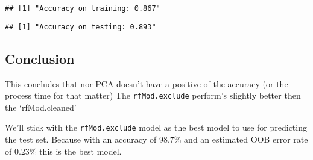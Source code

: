\documentclass[]{article}
\newenvironment{Shaded}{\begin{snugshade}}{\end{snugshade}}
\newcommand{\DecValTok}[1]{\textcolor[rgb]{0.00,0.00,0.81}{#1}}
\newcommand{\KeywordTok}[1]{\textcolor[rgb]{0.13,0.29,0.53}{\textbf{#1}}}
\newcommand{\NormalTok}[1]{#1}
\newcommand{\OperatorTok}[1]{\textcolor[rgb]{0.81,0.36,0.00}{\textbf{#1}}}
\newcommand{\StringTok}[1]{\textcolor[rgb]{0.31,0.60,0.02}{#1}}
\begin{document}
\begin{Shaded}
\end{Shaded}

\begin{verbatim}
## [1] "Accuracy on training: 0.867"
\end{verbatim}

\begin{Shaded}
\end{Shaded}

\begin{verbatim}
## [1] "Accuracy on testing: 0.893"
\end{verbatim}

\hypertarget{conclusion}{%
\subsection{Conclusion}\label{conclusion}}

This concludes that nor PCA doesn't have a positive of the accuracy (or
the process time for that matter) The \texttt{rfMod.exclude} perform's
slightly better then the `rfMod.cleaned'

We'll stick with the \texttt{rfMod.exclude} model as the best model to
use for predicting the test set. Because with an accuracy of 98.7\% and
an estimated OOB error rate of 0.23\% this is the best model.
\end{document}

